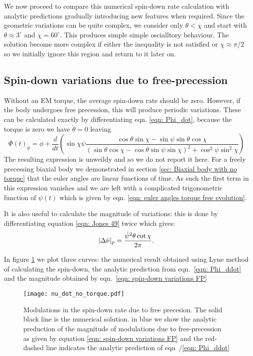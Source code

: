 \documentclass[/home/greg/Thesis/main/main.tex]{subfiles}
\begin{document}
We now proceed to compare this numerical spin-down rate calculation with analytic
predictions gradually introducing new features when required. Since the geometric
variations can be quite complex, we consider only $\theta < \chi$ and start 
with $\theta \approx 3^{\circ}$ and $\chi=60^{\circ}$. This produces simple
simple oscialltory behaviour. The solution become more complex if either
the inequality is not satisfied or $\chi \approx \pi/2$ so we initially
ignore this region and return to it later on.

\subsection{Spin-down variations due to free-precession}
Without an EM torque, the average spin-down rate should be zero. However, if
the body undergoes free precession, this will produce periodic variations. These
can be calculated exactly by differentiating eqn. \eqref{eqn: Phi_dot}, because
the torque is zero we have $\dot{\theta} = 0$ leaving
\begin{equation}
    \ddot{\Phi}(t)_{\mathrm{p}} = \ddot{\phi} + \frac{d}{dt}\left(
        \sin\chi\dot{\psi} \frac{\cos\theta\sin\chi - \sin \psi \sin \theta \cos\chi 
}{(\sin\theta \cos \chi - \cos \theta \sin \psi \sin \chi)^{2} + \cos^{2}\psi \sin^{2} \chi}
\right)
\label{eqn: Phi_ddot FP}
\end{equation}
The resulting expression is unweildy and so we do not report it here. For a 
freely precessing biaxial body we demonstrated in section \ref{sec: Biaxial body with no torque}
that the euler angles are linear functions of time. As such the first term 
in this expression vanishes and we are left with a complicated trigonometric
function of $\psi(t)$ which is given by eqn. \eqref{eqn: euler angles torque free evolution}.

It is also useful to calculate the magnitude of variations: this is done by
differentiating equation \eqref{eqn: Jones 49} twice which gives:
\begin{equation}
    |\Delta\dot{\nu}|_{\mathrm{p}} =\frac{\dot{\psi}^{2} \theta \cot\chi}{2\pi}. 
    \label{eqn: spin-down variations FP}
\end{equation}

In figure \ref{fig: nu_dot no torque} we plot three curves: the numerical
result obtained using Lyne method of calculating the spin-down, the analytic
prediction from eqn.~\eqref{eqn: Phi_ddot} and the magnitude obtained by
eqn.~\eqref{eqn: spin-down variations FP}
\begin{figure}[ht]
\centering
	\texttt{[image: nu\_dot\_no\_torque.pdf]}
\caption{Modulations in the spin-down rate due to free precesion. The solid black
         line is the numerical solution. in blue we show the analytic 
         preduction of the magnitude of modulations due to free-precession as
         given by equation \eqref{eqn: spin-down variations FP} and the red-dashed
         line indicates the analytic prediction of eqn~/\eqref{eqn: Phi_ddot}}
\label{fig: nu_dot no torque}
\end{figure}
\end{document}
